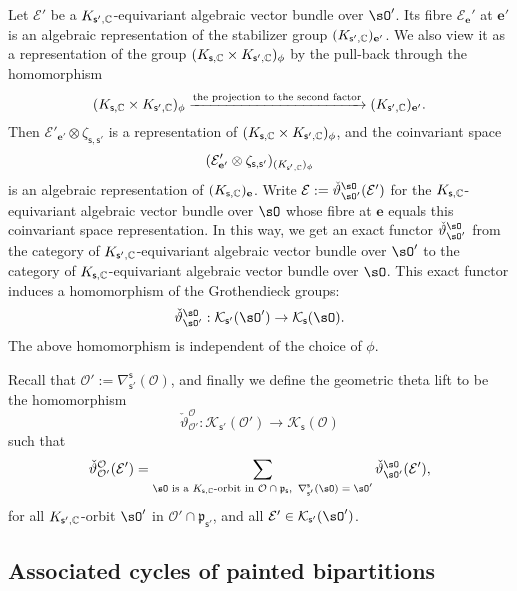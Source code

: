 \documentclass[12pt,a4paper]{amsart}
\newcommand{\CE}{{\mathcal {E}}}
\newcommand{\CK}{{\mathcal {K}}}
\newcommand{\CO}{{\mathcal {O}}}
\newcommand{\p}{\mathfrak p}
\numberwithin{equation}{section}
\theoremstyle{remark}
\begin{document}
 Let $\CE'$ be a $K_{\mathsf s',\mathbb{C}}$-equivariant algebraic vector bundle  over $\sO'$. Its fibre
$\CE_\mathbf e'$ at $\mathbf e'$ is an algebraic representation of the stabilizer group $(K_{\mathsf s',\mathbb{C}})_{\mathbf e'}$. We also view it as a representation of the group
$(K_{\mathsf s,\mathbb{C}}\times K_{\mathsf s', \mathbb{C}})_\phi$ by the pull-back through the homomorphism
\[
  (K_{\mathsf s,\mathbb{C}}\times K_{\mathsf s', \mathbb{C}})_\phi\xrightarrow{\textrm{the projection to the second factor}} (K_{\mathsf s',\mathbb{C}})_{\mathbf e'}.
\]
Then $\CE'_{\mathbf e'} \otimes \zeta_{\mathsf s, \mathsf s'}$ is a representation of $ (K_{\mathsf s,\mathbb{C}}\times K_{\mathsf s', \mathbb{C}})_\phi$, and the coinvariant space
\[
(\CE'_{\mathbf e'} \otimes \zeta_{\mathsf s, \mathsf s'})_{ (K_{\mathsf s',\C})_\phi}
\]
 is an algebraic representation of $(K_{\mathsf s,\mathbb{C}})_{\mathbf e}$. Write $\CE:= \check \vartheta_{\sO'}^{\sO}(\mathcal E')$ for the  $K_{\mathsf s,\mathbb{C}}$-equivariant algebraic vector bundle  over $\sO$ whose fibre at $\mathbf e$ equals this coinvariant space representation. In this way, we get an exact functor $  \check \vartheta_{\sO'}^{\sO}$ from the category of
$K_{\mathsf s',\mathbb{C}}$-equivariant algebraic vector bundle  over $\sO'$ to the category of $K_{\mathsf s,\mathbb{C}}$-equivariant algebraic vector bundle  over $\sO$. This exact functor induces a  homomorphism of the  Grothendieck groups:
\[
   \check \vartheta_{\sO'}^{\sO}:  \CK_{\mathsf s'}(\sO')\rightarrow  \CK_{\mathsf s}(\sO).
\]
The above homomorphism is independent of the choice of $\phi$.









Recall that $\CO':= \nabla^{\mathsf s}_{\mathsf s'}(\CO)$, and finally we define the geometric theta lift to be the homomorphism
\[
 \check \vartheta_{\CO'}^{\CO}: \CK_{\mathsf s'}(\CO')\rightarrow \CK_{\mathsf s}(\CO)
\]
such that
\[
 \check \vartheta_{\CO'}^{\CO}(\CE')= \sum_{\sO\textrm{ is a $K_{\mathsf s, \C} $-orbit in $\CO\cap \p_{\mathsf s}$,  $\, \nabla^{\mathsf s}_{\mathsf s'}(\sO)=\sO'$}}    \check \vartheta_{\sO'}^{\sO}(\CE'),
\]
for all $K_{\mathsf s', \mathbb{C}} $-orbit $\sO'$ in $\CO'\cap \p_{\mathsf s'}$, and all $\CE'\in \CK_{\mathsf s'}(\sO')$.


\subsection{Associated cycles of painted bipartitions}\label{subsecass}
\end{document}
